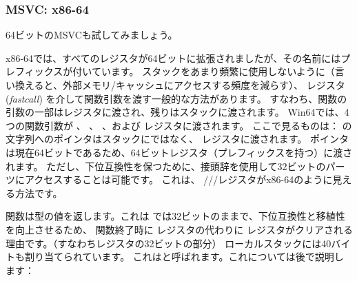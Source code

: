 \subsubsection{MSVC: x86-64}

64ビットのMSVCも試してみましょう。




x86-64では、すべてのレジスタが64ビットに拡張されましたが、その名前にはプレフィックスが付いています。 
スタックをあまり頻繁に使用しないように（言い換えると、外部メモリ/キャッシュにアクセスする頻度を減らす）、
レジスタ(\emph{fastcall}) を介して関数引数を渡す一般的な方法があります。 
すなわち、関数の引数の一部はレジスタに渡され、残りはスタックに渡されます。 
Win64では、4つの関数引数が \RCX 、 \RDX 、  、および  レジスタに渡されます。 
ここで見るものは： \printf の文字列へのポインタはスタックにではなく、 \RCX レジスタに渡されます。 
ポインタは現在64ビットであるため、64ビットレジスタ（プレフィックスを持つ）に渡されます。 
ただし、下位互換性を保つために、接頭辞を使用して32ビットのパーツにアクセスすることは可能です。 
これは、 \RAX/\EAX/\AX/\AL レジスタがx86-64のように見える方法です。


\main 関数は\Tint{}型の値を返します。これは \CCpp では32ビットのままで、下位互換性と移植性を向上させるため、
関数終了時に \RAX レジスタの代わりに \EAX レジスタがクリアされる理由です。（すなわちレジスタの32ビットの部分） 
ローカルスタックには40バイトも割り当てられています。 
これはと呼ばれます。これについては後で説明します：

